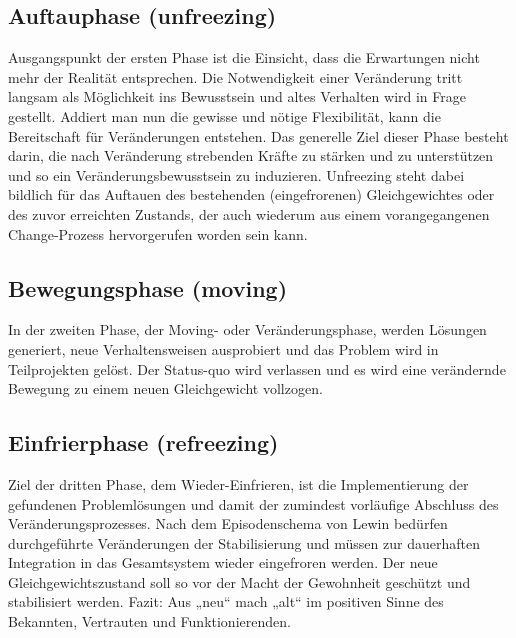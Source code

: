\documentclass[]{scrreprt}
\begin{document}
    \subsection{Auftauphase (unfreezing)}
    Ausgangspunkt der ersten Phase ist die Einsicht, dass die Erwartungen nicht mehr der Realität entsprechen. Die Notwendigkeit einer Veränderung tritt langsam als Möglichkeit ins Bewusstsein und altes Verhalten wird in Frage gestellt. Addiert man nun die gewisse und nötige Flexibilität, kann die Bereitschaft für Veränderungen entstehen. Das generelle Ziel dieser Phase besteht darin, die nach Veränderung strebenden Kräfte zu stärken und zu unterstützen und so ein Veränderungsbewusstsein zu induzieren. Unfreezing steht dabei bildlich für das Auftauen des bestehenden (eingefrorenen) Gleichgewichtes oder des zuvor erreichten Zustands, der auch wiederum aus einem vorangegangenen Change-Prozess hervorgerufen worden sein kann.
    
    \subsection{Bewegungsphase (moving)}
    In der zweiten Phase, der Moving- oder Veränderungsphase, werden Lösungen generiert, neue Verhaltensweisen ausprobiert und das Problem wird in Teilprojekten gelöst. Der Status-quo wird verlassen und es wird eine verändernde Bewegung zu einem neuen Gleichgewicht vollzogen.
   
    \subsection{Einfrierphase (refreezing)}
    Ziel der dritten Phase, dem Wieder-Einfrieren, ist die Implementierung der gefundenen Problemlösungen und damit der zumindest vorläufige Abschluss des Veränderungsprozesses. Nach dem Episodenschema von Lewin bedürfen durchgeführte Veränderungen der Stabilisierung und müssen zur dauerhaften Integration in das Gesamtsystem wieder eingefroren werden. Der neue Gleichgewichtszustand soll so vor der Macht der Gewohnheit geschützt und stabilisiert werden. Fazit: Aus „neu“ mach „alt“ im positiven Sinne des Bekannten, Vertrauten und Funktionierenden.
    
\end{document}
